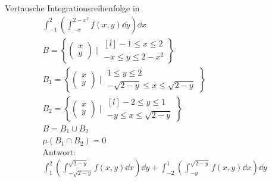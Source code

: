 \begin{bsp}
	Vertausche Integrationsreihenfolge in
	\begin{gather*}
		\int_{-1}^2 \left( \int_{-x}^{2-x^2} f(x,y) \dd y \right) \dd x \\
		B = \left\{ \begin{pmatrix} x \\ y \end{pmatrix} \mid \begin{matrix*}[l] -1 \leq x \leq 2 \\ -x \leq y \leq 2 - x^2 \end{matrix*} \right\} \\
		B_1 = \left\{ \begin{pmatrix} x \\ y \end{pmatrix} \mid \begin{matrix*} 1 \leq y \leq 2 \\ -\sqrt{2-y} \leq x \leq \sqrt{2-y} \end{matrix*} \right\} \\
		B_2 = \left\{ \begin{pmatrix} x \\ y \end{pmatrix} \mid \begin{matrix*}[l] -2 \leq y \leq 1 \\ -y \leq x \leq \sqrt{2-y} \end{matrix*} \right\} \\
		B = B_1 \cup B_2 \\ 
		\mu( B_1 \cap B_2 ) = 0 \\
		\text{Antwort:} \\
		\int_1^2 \left( \int_{-\sqrt{2-y}}^{\sqrt{2-y}} f(x,y) \dd x \right) \dd y + \int_{-2}^1 \left( \int_{-y}^{\sqrt{2-y}} f(x,y) \dd x \right) \dd y
	\end{gather*}
\end{bsp}


